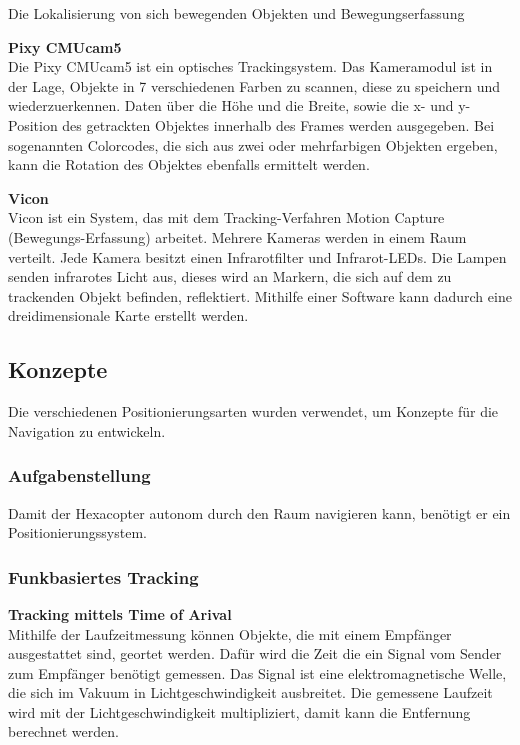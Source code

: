\begin{itemize}
    Die Lokalisierung von sich bewegenden Objekten und Bewegungserfassung

    \textbf{Pixy CMUcam5}\\
    Die Pixy CMUcam5 ist ein optisches Trackingsystem. Das Kameramodul ist in der Lage, Objekte in 7 verschiedenen Farben zu scannen, diese zu speichern und wiederzuerkennen. Daten über die Höhe und die Breite, sowie die x- und y-Position des getrackten Objektes innerhalb des Frames werden ausgegeben. Bei sogenannten Colorcodes, die sich aus zwei oder mehrfarbigen Objekten ergeben, kann die Rotation des Objektes ebenfalls ermittelt werden.
    \cite{Pixy}

    \textbf{Vicon}\\
    Vicon ist ein System, das mit dem Tracking-Verfahren Motion Capture (Bewegungs-Erfassung) arbeitet. 
    Mehrere Kameras werden in einem Raum verteilt. Jede Kamera besitzt einen Infrarotfilter und Infrarot-LEDs. Die Lampen senden infrarotes Licht aus, dieses wird an Markern, die sich auf dem zu trackenden Objekt befinden, reflektiert. Mithilfe einer Software kann dadurch eine dreidimensionale Karte erstellt werden.
    \cite{Vicon}

  \subsection{Konzepte}
  Die verschiedenen Positionierungsarten wurden verwendet, um Konzepte für die Navigation zu entwickeln.

    \subsubsection{Aufgabenstellung}
    Damit der Hexacopter autonom durch den Raum navigieren kann, benötigt er ein Positionierungssystem.

    \subsubsection{Funkbasiertes Tracking}

      \textbf{Tracking mittels Time of Arival}\\

      Mithilfe der Laufzeitmessung können Objekte, die mit einem Empfänger ausgestattet sind, geortet werden. Dafür wird die Zeit die ein Signal vom Sender zum Empfänger benötigt gemessen. Das Signal ist eine elektromagnetische Welle, die sich im Vakuum in Lichtgeschwindigkeit ausbreitet. Die gemessene Laufzeit wird mit der Lichtgeschwindigkeit multipliziert, damit kann die Entfernung berechnet werden. 


\end{itemize}
